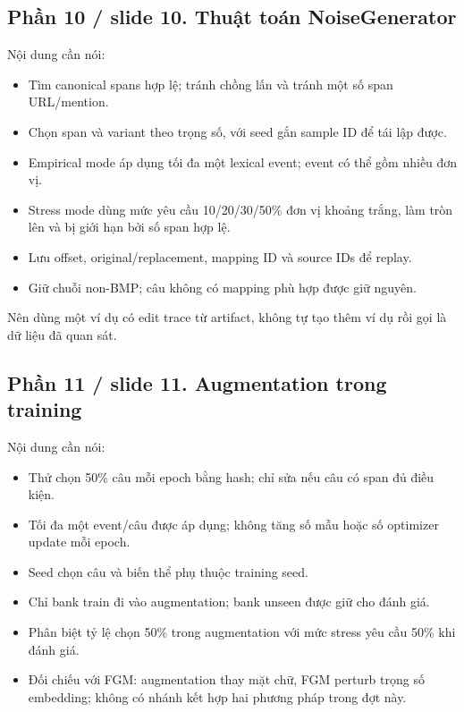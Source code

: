 \documentclass[11pt,a4paper]{article}
\begin{document}
\subsection*{Phần 10 / slide 10. Thuật toán NoiseGenerator}

Nội dung cần nói:


\begin{itemize}

\item Tìm canonical spans hợp lệ; tránh chồng lấn và tránh một số span URL/mention.

\item Chọn span và variant theo trọng số, với seed gắn sample ID để tái lập được.

\item Empirical mode áp dụng tối đa một lexical event; event có thể gồm nhiều đơn vị.

\item Stress mode dùng mức yêu cầu 10/20/30/50\% đơn vị khoảng trắng, làm tròn lên và bị giới hạn bởi số span hợp lệ.

\item Lưu offset, original/replacement, mapping ID và source IDs để replay.

\item Giữ chuỗi non-BMP; câu không có mapping phù hợp được giữ nguyên.

\end{itemize}

Nên dùng một ví dụ có edit trace từ artifact, không tự tạo thêm ví dụ rồi gọi là dữ liệu đã quan sát.


\subsection*{Phần 11 / slide 11. Augmentation trong training}

Nội dung cần nói:


\begin{itemize}

\item Thử chọn 50\% câu mỗi epoch bằng hash; chỉ sửa nếu câu có span đủ điều kiện.

\item Tối đa một event/câu được áp dụng; không tăng số mẫu hoặc số optimizer update mỗi epoch.

\item Seed chọn câu và biến thể phụ thuộc training seed.

\item Chỉ bank train đi vào augmentation; bank unseen được giữ cho đánh giá.

\item Phân biệt tỷ lệ chọn 50\% trong augmentation với mức stress yêu cầu 50\% khi đánh giá.

\item Đối chiếu với FGM: augmentation thay mặt chữ, FGM perturb trọng số embedding; không có nhánh kết hợp hai phương pháp trong đợt này.

\end{itemize}
\end{document}
